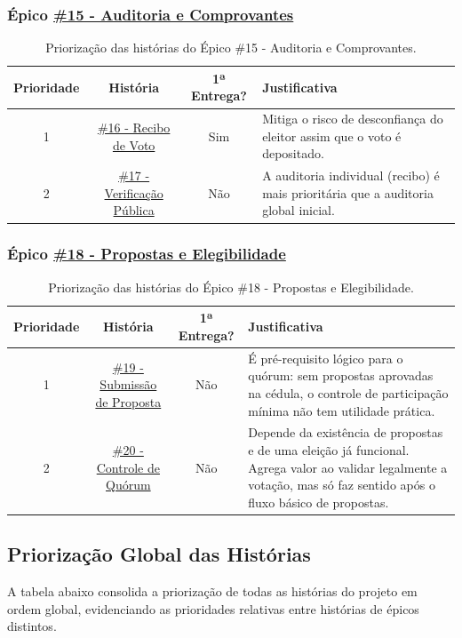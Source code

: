 \documentclass[12pt,a4paper]{article}
\begin{document}
\subsubsection*{Épico \href{https://github.com/gsscala/MC656/issues/15}{\#15 - Auditoria e Comprovantes}}
\begin{table}[H]
\centering
\begin{tabularx}{\textwidth}{c c c X}
\toprule
\textbf{Prioridade} & \textbf{História} & \textbf{1ª Entrega?} & \textbf{Justificativa} \\
\midrule
1 & \href{https://github.com/gsscala/MC656/issues/16}{\#16 - Recibo de Voto} & Sim & Mitiga o risco de desconfiança do eleitor assim que o voto é depositado. \\
2 & \href{https://github.com/gsscala/MC656/issues/17}{\#17 - Verificação Pública} & Não & A auditoria individual (recibo) é mais prioritária que a auditoria global inicial. \\
\bottomrule
\end{tabularx}
\caption{Priorização das histórias do Épico \#15 - Auditoria e Comprovantes.}
\end{table}

\subsubsection*{Épico \href{https://github.com/gsscala/MC656/issues/18}{\#18 - Propostas e Elegibilidade}}
\begin{table}[H]
\centering
\begin{tabularx}{\textwidth}{c c c X}
\toprule
\textbf{Prioridade} & \textbf{História} & \textbf{1ª Entrega?} & \textbf{Justificativa} \\
\midrule
1 & \href{https://github.com/gsscala/MC656/issues/19}{\#19 - Submissão de Proposta} & Não & É pré-requisito lógico para o quórum: sem propostas aprovadas na cédula, o controle de participação mínima não tem utilidade prática. \\
2 & \href{https://github.com/gsscala/MC656/issues/20}{\#20 - Controle de Quórum} & Não & Depende da existência de propostas e de uma eleição já funcional. Agrega valor ao validar legalmente a votação, mas só faz sentido após o fluxo básico de propostas. \\
\bottomrule
\end{tabularx}
\caption{Priorização das histórias do Épico \#18 - Propostas e Elegibilidade.}
\end{table}

\subsection{Priorização Global das Histórias}
A tabela abaixo consolida a priorização de todas as histórias do projeto em ordem global, evidenciando as prioridades relativas entre histórias de épicos distintos.
\end{document}

